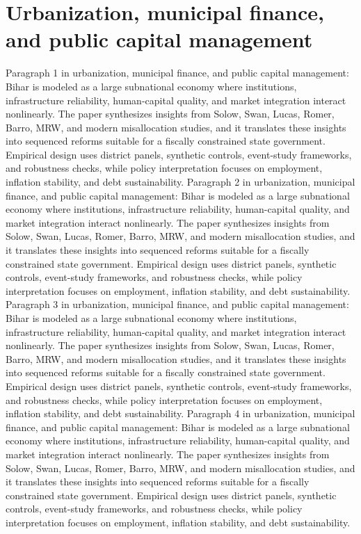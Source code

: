\documentclass[preprint,12pt]{elsarticle}
\begin{document}
\section{Urbanization, municipal finance, and public capital management}
Paragraph 1 in urbanization, municipal finance, and public capital management: Bihar is modeled as a large subnational economy where institutions, infrastructure reliability, human-capital quality, and market integration interact nonlinearly. The paper synthesizes insights from Solow, Swan, Lucas, Romer, Barro, MRW, and modern misallocation studies, and it translates these insights into sequenced reforms suitable for a fiscally constrained state government. Empirical design uses district panels, synthetic controls, event-study frameworks, and robustness checks, while policy interpretation focuses on employment, inflation stability, and debt sustainability.
Paragraph 2 in urbanization, municipal finance, and public capital management: Bihar is modeled as a large subnational economy where institutions, infrastructure reliability, human-capital quality, and market integration interact nonlinearly. The paper synthesizes insights from Solow, Swan, Lucas, Romer, Barro, MRW, and modern misallocation studies, and it translates these insights into sequenced reforms suitable for a fiscally constrained state government. Empirical design uses district panels, synthetic controls, event-study frameworks, and robustness checks, while policy interpretation focuses on employment, inflation stability, and debt sustainability.
Paragraph 3 in urbanization, municipal finance, and public capital management: Bihar is modeled as a large subnational economy where institutions, infrastructure reliability, human-capital quality, and market integration interact nonlinearly. The paper synthesizes insights from Solow, Swan, Lucas, Romer, Barro, MRW, and modern misallocation studies, and it translates these insights into sequenced reforms suitable for a fiscally constrained state government. Empirical design uses district panels, synthetic controls, event-study frameworks, and robustness checks, while policy interpretation focuses on employment, inflation stability, and debt sustainability.
Paragraph 4 in urbanization, municipal finance, and public capital management: Bihar is modeled as a large subnational economy where institutions, infrastructure reliability, human-capital quality, and market integration interact nonlinearly. The paper synthesizes insights from Solow, Swan, Lucas, Romer, Barro, MRW, and modern misallocation studies, and it translates these insights into sequenced reforms suitable for a fiscally constrained state government. Empirical design uses district panels, synthetic controls, event-study frameworks, and robustness checks, while policy interpretation focuses on employment, inflation stability, and debt sustainability.
\end{document}
